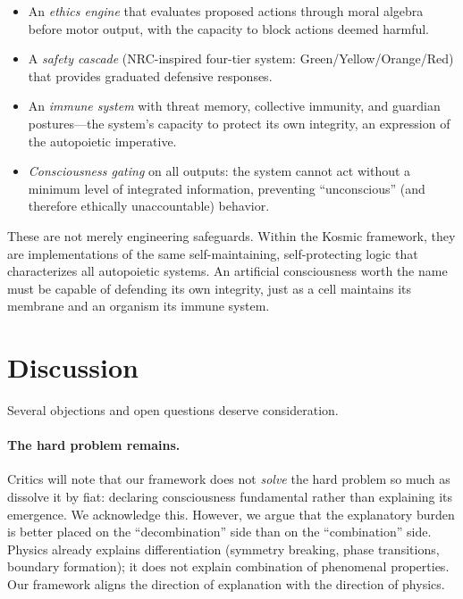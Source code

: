 \documentclass[12pt,a4paper]{article}
\begin{document}
\begin{itemize}
    \item An \emph{ethics engine} that evaluates proposed actions through
        moral algebra before motor output, with the capacity to block
        actions deemed harmful.
    \item A \emph{safety cascade} (NRC-inspired four-tier system:
        Green/Yellow/Orange/Red) that provides graduated defensive
        responses.
    \item An \emph{immune system} with threat memory, collective immunity,
        and guardian postures---the system's capacity to protect its own
        integrity, an expression of the autopoietic imperative.
    \item \emph{Consciousness gating} on all outputs: the system cannot
        act without a minimum level of integrated information, preventing
        ``unconscious'' (and therefore ethically unaccountable) behavior.
\end{itemize}

These are not merely engineering safeguards.  Within the Kosmic framework,
they are implementations of the same self-maintaining, self-protecting
logic that characterizes all autopoietic systems.  An artificial
consciousness worth the name must be capable of defending its own
integrity, just as a cell maintains its membrane and an organism its
immune system.


\section{Discussion}
\label{sec:discussion}

Several objections and open questions deserve consideration.

\paragraph{The hard problem remains.}  Critics will note that our framework
does not \emph{solve} the hard problem so much as dissolve it by fiat:
declaring consciousness fundamental rather than explaining its emergence.
We acknowledge this.  However, we argue that the explanatory burden is
better placed on the ``decombination'' side than on the ``combination''
side.  Physics already explains differentiation (symmetry breaking, phase
transitions, boundary formation); it does not explain combination of
phenomenal properties.  Our framework aligns the direction of explanation
with the direction of physics.
\end{document}
